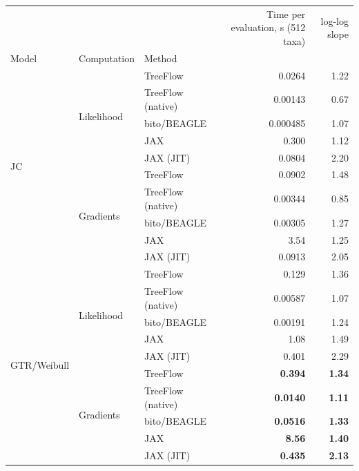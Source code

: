 \documentclass{article}
\begin{document}
\begin{table}
    \centering
    \begin{tabular}{lllrr}
\toprule
 &  &  & Time per evaluation, s (512 taxa) & log-log slope \\
Model & Computation & Method &  &  \\
\midrule
\multirow[t]{10}{*}{JC} & \multirow[t]{5}{*}{Likelihood} & TreeFlow & 0.0264 & 1.22 \\
 &  & TreeFlow (native) & 0.00143 & 0.67 \\
 &  & bito/BEAGLE & 0.000485 & 1.07 \\
 &  & JAX & 0.300 & 1.12 \\
 &  & JAX (JIT) & 0.0804 & 2.20 \\
 & \multirow[t]{5}{*}{Gradients} & TreeFlow & 0.0902 & 1.48 \\
 &  & TreeFlow (native) & 0.00344 & 0.85 \\
 &  & bito/BEAGLE & 0.00305 & 1.27 \\
 &  & JAX & 3.54 & 1.25 \\
 &  & JAX (JIT) & 0.0913 & 2.05 \\
\multirow[t]{10}{*}{GTR/Weibull} & \multirow[t]{5}{*}{Likelihood} & TreeFlow & 0.129 & 1.36 \\
 &  & TreeFlow (native) & 0.00587 & 1.07 \\
 &  & bito/BEAGLE & 0.00191 & 1.24 \\
 &  & JAX & 1.08 & 1.49 \\
 &  & JAX (JIT) & 0.401 & 2.29 \\
 & \multirow[t]{5}{*}{Gradients} & TreeFlow & \bfseries 0.394 & \bfseries 1.34 \\
 &  & TreeFlow (native) & \bfseries 0.0140 & \bfseries 1.11 \\
 &  & bito/BEAGLE & \bfseries 0.0516 & \bfseries 1.33 \\
 &  & JAX & \bfseries 8.56 & \bfseries 1.40 \\
 &  & JAX (JIT) & \bfseries 0.435 & \bfseries 2.13 \\
\bottomrule
\end{tabular}
\end{table}
\end{document}
